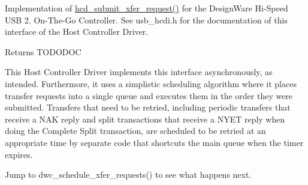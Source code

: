 Implementation of \hyperlink{group__usbhcd_ga72b7448515ed0c92480cb6737009e626}{hcd\-\_\-submit\-\_\-xfer\-\_\-request()} for the Design\-Ware Hi-\/\-Speed U\-S\-B 2. On-\/\-The-\/\-Go Controller. See usb\-\_\-hcdi.\-h for the documentation of this interface of the Host Controller Driver. \begin{DoxyReturn}{Returns}
T\-O\-D\-O\-D\-O\-C
\end{DoxyReturn}
This Host Controller Driver implements this interface asynchronously, as intended. Furthermore, it uses a simplistic scheduling algorithm where it places transfer requests into a single queue and executes them in the order they were submitted. Transfers that need to be retried, including periodic transfers that receive a N\-A\-K reply and split transactions that receive a N\-Y\-E\-T reply when doing the Complete Split transaction, are scheduled to be retried at an appropriate time by separate code that shortcuts the main queue when the timer expires.

Jump to dwc\-\_\-schedule\-\_\-xfer\-\_\-requests() to see what happens next. 